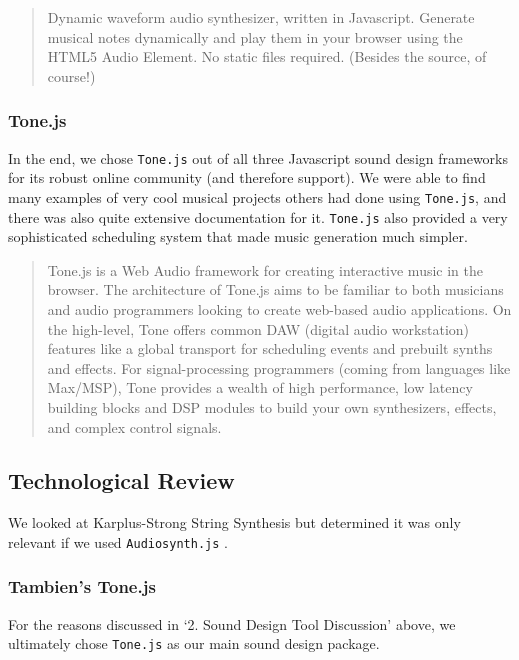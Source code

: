 \documentclass[12pt,a4paper]{article}
\newcommand{\lightcode}[1]{\colorbox{light-gray}{\texttt{#1}}}
\begin{document}
\begin{quote}
Dynamic waveform audio synthesizer, written in Javascript. Generate musical notes dynamically and play them in your browser using the HTML5 Audio Element. No static files required. (Besides the source, of course!) \cite{audiosynth}
\end{quote}


\subsubsection{Tone.js}
In the end, we chose \lightcode{Tone.js} out of all three Javascript sound design frameworks for its robust online community (and therefore support). We were able to find many examples of very cool musical projects others had done using \lightcode{Tone.js}, and there was also quite extensive documentation for it. \lightcode{Tone.js} also provided a very sophisticated scheduling system that made music generation much simpler.

\begin{quote}
Tone.js is a Web Audio framework for creating interactive music in the browser. The architecture of Tone.js aims to be familiar to both musicians and audio programmers looking to create web-based audio applications. On the high-level, Tone offers common DAW (digital audio workstation) features like a global transport for scheduling events and prebuilt synths and effects. For signal-processing programmers (coming from languages like Max/MSP), Tone provides a wealth of high performance, low latency building blocks and DSP modules to build your own synthesizers, effects, and complex control signals. \cite{tonejs}
\end{quote}

\subsection{Technological Review}

We looked at Karplus-Strong String Synthesis but determined it was only relevant if we used \lightcode{Audiosynth.js} \cite{karplus-strong}.

\subsubsection{Tambien's Tone.js}
For the reasons discussed in `2. Sound Design Tool Discussion' above, we ultimately chose \lightcode{Tone.js} as our main sound design package.
\end{document}
